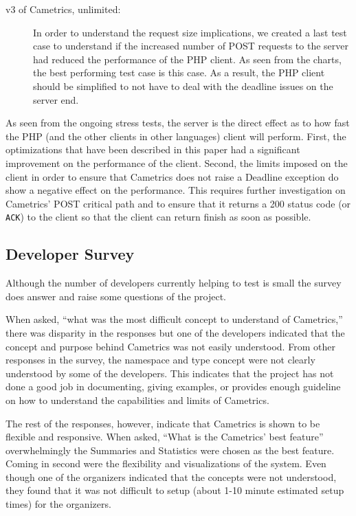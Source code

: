 \documentclass[10pt,a4paper,english]{article}
\begin{document}
\begin{description}
\item[{v3 of Cametrics, unlimited:}] \leavevmode 
In order to understand the request size implications, we created a last test case to understand if the increased number of POST requests to the server had reduced the performance of the PHP client. As seen from the charts, the best performing test case is this case. As a result, the PHP client should be simplified to not have to deal with the deadline issues on the server end.

\end{description}

As seen from the ongoing stress tests, the server is the direct effect as to how fast the PHP (and the other clients in other languages) client will perform. First, the optimizations that have been described in this paper had a significant improvement on the performance of the client. Second, the limits imposed on the client in order to ensure that Cametrics does not raise a Deadline exception do show a negative effect on the performance. This requires further investigation on Cametrics' POST critical path and to ensure that it returns a 200 status code (or \texttt{ACK}) to the client so that the client can return finish as soon as possible.



\hypertarget{developer-survey}{}
\subsection*{Developer Survey}
\label{developer-survey}

Although the number of developers currently helping to test is small the survey does answer and raise some questions of the project.

When asked, ``what was the most difficult concept to understand of Cametrics,'' there was disparity in the responses but one of the developers indicated that the concept and purpose behind Cametrics was not easily understood. From other responses in the survey, the namespace and type concept were not clearly understood by some of the developers. This indicates that the project has not done a good job in documenting, giving examples, or provides enough guideline on how to understand the capabilities and limits of Cametrics.

The rest of the responses, however, indicate that Cametrics is shown to be flexible and responsive. When asked, ``What is the Cametrics' best feature'' overwhelmingly the Summaries and Statistics were chosen as the best feature. Coming in second were the flexibility and visualizations of the system. Even though one of the organizers indicated that the concepts were not understood, they found that it was not difficult to setup (about 1-10 minute estimated setup times) for the organizers.
\end{document}
